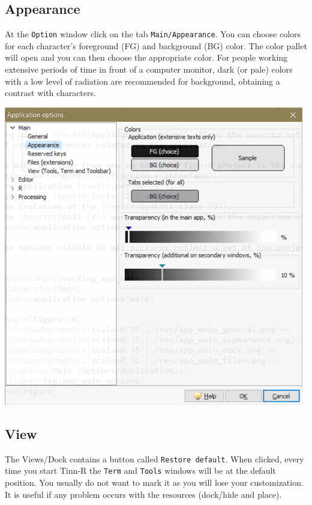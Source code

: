 \subsection{Appearance}

At the \texttt{Option} window click on the tab \texttt{Main/Appearance}.
You can choose colors for each character's foreground (FG) and background (BG) color.
The color pallet will open and you can then choose the appropriate color.
For people working extensive periods of time in front of a computer monitor,
dark (or pale) colors with a low level of radiation are recommended for background,
obtaining a contrast with characters.

\vspace{5mm}
\includegraphics[scale=0.8]{./res/app_main_appearance.png}
\vspace{5mm}

\subsection{View}

The Views/Dock contains a button called \texttt{Restore default}.
When clicked, every time you start Tinn-R the \texttt{Term} and \texttt{Tools} windows will be at the default position.
You usually do not want to mark it as you will lose your customization.
It is useful if any problem occurs with the resources (dock/hide and place).

